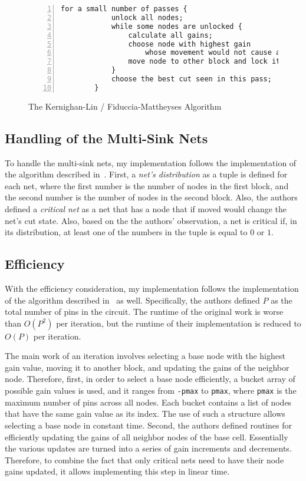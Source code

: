 \documentclass[11pt]{article}
\begin{document}
\begin{figure}[H]
	\small
	\begin{Verbatim}[tabsize=4,xleftmargin=5mm,numbers=left]
		for a small number of passes {
			unlock all nodes;
			while some nodes are unlocked {
				calculate all gains;
				choose node with highest gain 
					whose movement would not cause an imbalance;
				move node to other block and lock it;
			}
			choose the best cut seen in this pass;
		}
	\end{Verbatim}
	\caption{The Kernighan-Lin / Fiduccia-Mattheyses Algorithm}
	\label{alg:kl}
\end{figure}


\subsection{Handling of the Multi-Sink Nets}

To handle the multi-sink nets, my implementation follows the implementation of the algorithm 
described in~\cite{1585498}. First, a \textit{net's distribution} as a tuple is defined for each net,  
where the first number is the number of nodes in the first block, and the second number is the 
number of nodes in the second block. Also, the authors defined a \textit{critical net} as a net 
that has a node that if moved would change the net's cut state. Also, based on the the authors' 
observation, a net is critical if, in its distribution, at least one of the numbers in the tuple 
is equal to \(0\) or \(1\).

\subsection{Efficiency}

With the efficiency consideration, my implementation follows the implementation of the algorithm 
described in~\cite{1585498} as well. Specifically, the authors defined \(P\) as the total number 
of pins in the circuit. The runtime of the original work is worse than \(O(P^2)\) per iteration, 
but the runtime of their implementation is reduced to \(O(P)\) per iteration.

The main work of an iteration involves selecting a base node with the highest gain value, moving 
it to another block, and updating the gains of the neighbor node. Therefore, first, in order to 
select a base node efficiently, a bucket array of possible gain values is used, and it ranges from 
\texttt{-pmax} to \texttt{pmax}, where \texttt{pmax} is the maximum number of pins across all nodes. 
Each bucket contains a list of nodes that have the same gain value as its index. The use of such a 
structure allows selecting a base node in constant time. Second, the authors defined routines for 
efficiently updating the gains of all neighbor nodes of the base cell. Essentially the various 
updates are turned into a series of gain increments and decrements. Therefore, to combine the fact 
that only critical nets need to have their node gains updated, it allows implementing this step 
in linear time.
\end{document}
